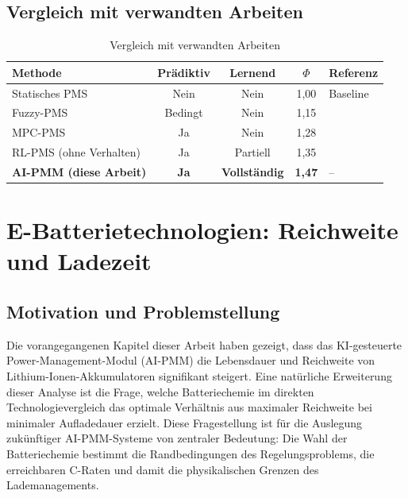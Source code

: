﻿\documentclass[12pt,a4paper]{article}
\begin{document}
	\subsection{Vergleich mit verwandten Arbeiten}
	
	\begin{table}[H]
		\centering
		\caption{Vergleich mit verwandten Arbeiten}
		\label{tab:comparison}
		\begin{tabular}{lcccl}
			\toprule
			\textbf{Methode} & \textbf{Prädiktiv} & \textbf{Lernend} & $\Phi$ & \textbf{Referenz} \\
			\midrule
			Statisches PMS & Nein & Nein & 1{,}00 & Baseline \\
			Fuzzy-PMS & Bedingt & Nein & 1{,}15 & \cite{Fuzzy2019} \\
			MPC-PMS & Ja & Nein & 1{,}28 & \cite{MPC2021} \\
			RL-PMS (ohne Verhalten) & Ja & Partiell & 1{,}35 & \cite{RL2022} \\
			\textbf{AI-PMM (diese Arbeit)} & \textbf{Ja} & \textbf{Vollständig} & \textbf{1{,}47} & -- \\
			\bottomrule
		\end{tabular}
	\end{table}
	
	\section{E-Batterietechnologien: Reichweite und Ladezeit}
	\label{sec:technologievergleich}

	\subsection{Motivation und Problemstellung}

	Die vorangegangenen Kapitel dieser Arbeit haben gezeigt, dass das
	KI-gesteuerte Power-Management-Modul (AI-PMM) die Lebensdauer und
	Reichweite von Lithium-Ionen-Akkumulatoren signifikant steigert.
	Eine natürliche Erweiterung dieser Analyse ist die Frage, welche
	Batteriechemie im direkten Technologievergleich das optimale
	Verhältnis aus maximaler Reichweite bei minimaler Aufladedauer
	erzielt. Diese Fragestellung ist für die Auslegung zukünftiger
	AI-PMM-Systeme von zentraler Bedeutung: Die Wahl der Batteriechemie
	bestimmt die Randbedingungen des Regelungsproblems, die erreichbaren
	C-Raten und damit die physikalischen Grenzen des Lademanagements.
\end{document}
